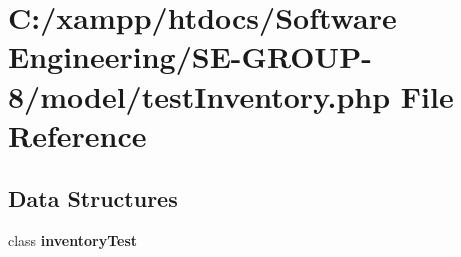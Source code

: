 \section{C\+:/xampp/htdocs/\+Software Engineering/\+S\+E-\/\+G\+R\+O\+U\+P-\/8/model/test\+Inventory.php File Reference}
\label{test_inventory_8php}
\subsection*{Data Structures}
\begin{DoxyCompactItemize}
\item 
class {\bf inventory\+Test}
\end{DoxyCompactItemize}
